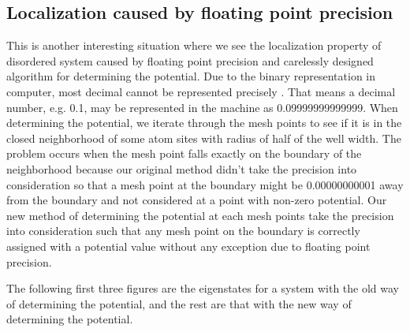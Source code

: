 \subsection{Localization caused by floating point precision}
This is another interesting situation where we see the localization property of disordered system caused by floating point precision and carelessly designed algorithm for determining the potential. 
Due to the binary representation in computer, most decimal cannot be represented precisely \cite{FloatingPrecision}. That means a decimal number, e.g. 0.1, may be represented in the machine as 0.09999999999999. 
When determining the potential, we iterate through the mesh points to see if it is in the closed neighborhood of some atom sites with radius of half of the well width. The problem occurs when the mesh point falls exactly on the boundary of the neighborhood because our original method didn't take the precision into consideration so that a mesh point at the boundary might be 0.00000000001 away from the boundary and not considered at a point with non-zero potential.
Our new method of determining the potential at each mesh points take the precision into consideration such that any mesh point on the boundary is correctly assigned with a potential value without any exception due to floating point precision.

The following first three figures are the eigenstates for a system with the old way of determining the potential, and the rest are that with the new way of determining the potential. 

